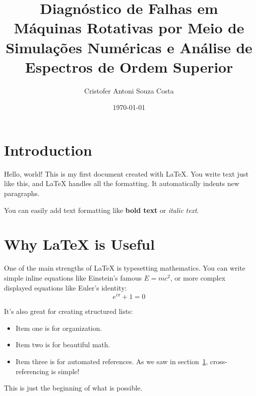 \documentclass{report}
\title{Diagnóstico de Falhas em Máquinas Rotativas por Meio de Simulações Numéricas e Análise de Espectros de Ordem Superior}
\author{Cristofer Antoni Souza Costa}
\date{\today}
\begin{document}
\maketitle %

\section{Introduction} %





\label{sec:intro} %

Hello, world! This is my first document created with \LaTeX. 
You write text just like this, and LaTeX handles all the formatting. 
It automatically indents new paragraphs.

You can easily add text formatting like \textbf{bold text} or \textit{italic text}.

\section{Why LaTeX is Useful} %

One of the main strengths of LaTeX is typesetting mathematics. You can write simple inline equations like Einstein's famous $E = mc^2$, or more complex displayed equations like Euler's identity:
\[
e^{i\pi} + 1 = 0
\]

It's also great for creating structured lists:
\begin{itemize}
    \item Item one is for organization.
    \item Item two is for beautiful math.
    \item Item three is for automated references. As we saw in section~\ref{sec:intro}, cross-referencing is simple!
\end{itemize}

This is just the beginning of what is possible.
\end{document}
